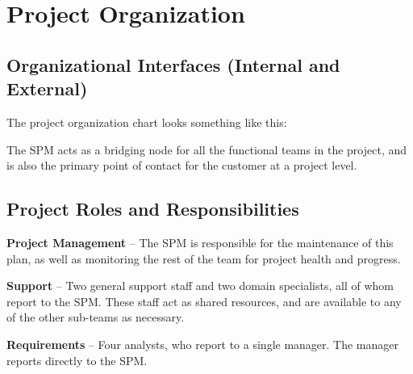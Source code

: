 \documentclass[11pt]{article}
\begin{document}
\section{Project Organization}
\subsection{Organizational Interfaces (Internal and External)}
The project organization chart looks something like this:

\begin{center}
\end{center}

The SPM acts as a bridging node for all the functional teams in the project, and is also the primary
point of contact for the customer at a project level.  





\subsection{Project Roles and Responsibilities}
\textbf{Project Management} -- The SPM is responsible for the maintenance of this plan, as well as
monitoring the rest of the team for project health and progress.

\textbf{Support} -- Two general support staff and two domain specialists, all of whom report to the SPM.
These staff act as shared resources, and are available to any of the other sub-teams as necessary.

\textbf{Requirements} -- Four analysts, who report to a single manager.  The manager reports directly to
the SPM.
\end{document}
